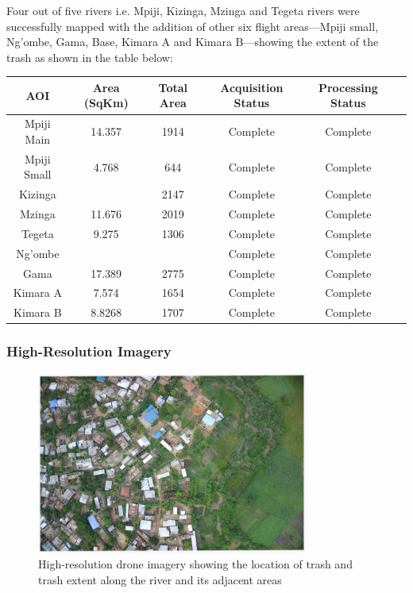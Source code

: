 \documentclass[a4paper,12pt,twoside]{article}
\begin{document}
        Four out of five rivers i.e. Mpiji, Kizinga, Mzinga and Tegeta rivers were successfully mapped with the addition of other six flight areas---Mpiji small, Ng'ombe, Gama, Base, Kimara A and Kimara B---showing the extent of the trash as shown in the table below:

        \begin{center}
          \begin{tabular}{|c|c|c|c|c|c|}  
            \hline
        	\bfseries AOI & \bfseries Area (SqKm) & \bfseries Total Area & \bfseries Acquisition Status & \bfseries Processing Status\\
        	\hline
            Mpiji Main & 14.357 & 1914 & Complete & Complete\\
            \hline
            Mpiji Small & 4.768 & 644 & Complete & Complete\\
            \hline
            Kizinga & & 2147 & Complete & Complete \\ %
            \hline
            Mzinga & 11.676 & 2019 & Complete & Complete \\
            \hline
            Tegeta & 9.275 & 1306 & Complete & Complete \\
            \hline
            Ng’ombe & & & Complete & Complete \\ %
            \hline
            Gama & 17.389 & 2775 & Complete & Complete \\
            \hline
            Kimara A & 7.574 & 1654 & Complete & Complete \\
            \hline
            Kimara B & 8.8268 & 1707 & Complete & Complete \\
            \hline
          
          \end{tabular}
        \end{center}
        
    \subsubsection{High-Resolution Imagery}
    
        \begin{figure} %
            \centering
            \includegraphics[width=0.8\textwidth]{images/image1.jpg}
            \caption{High-resolution drone imagery showing the location of trash and trash extent along the river and its adjacent areas}
        \end{figure}
        
\end{document}
